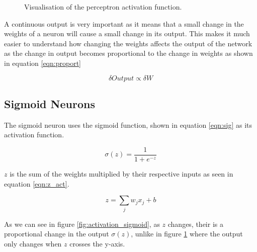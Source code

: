 \begin{figure}
\begin{center}
\caption{Visualisation of the perceptron activation function.}
\label{fig:activation_percep}
\end{center}
\end{figure}

A continuous output is very important as it means that a small change in the weights of a neuron will cause a small change in its output. This makes it much easier to understand how changing the weights affects the output of the network as the change in output becomes proportional to the change in weights as shown in equation \ref{eqn:proport}

\begin{equation}
	\delta Output \propto \delta W
	\label{eqn:proport}
\end{equation}  


\subsection{Sigmoid Neurons}

The sigmoid neuron uses the sigmoid function, shown in equation \ref{eqn:sig} as its activation function. 

\begin{equation}
\sigma(z) = \frac{1}{1 + e^{-z}}
\label{eqn:sig}
\end{equation}

$z$ is the sum of the weights multiplied by their respective inputs as seen in equation  \ref{eqn:z_act}.

\begin{equation}
z = \sum_{j} w_j x_j + b
\label{eqn:z_act}
\end{equation}

As we can see in figure \ref{fig:activation_sigmoid}, as $z$ changes, their is a proportional change in the output $\sigma(z)$, unlike in figure \ref{fig:activation_percep} where the output only changes when $z$ crosses the y-axis.

